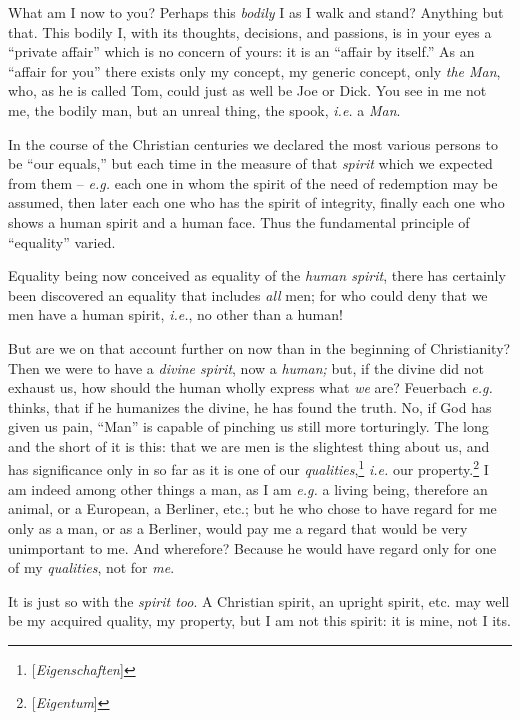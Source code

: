 \documentclass[12pt,a4paper]{book}
\begin{document}
What am I now to you? Perhaps this \textit{bodily} I as I walk and stand? 
Anything but that. This bodily I, with its thoughts, decisions, and passions, 
is in your eyes a ``private affair'' which is no concern of yours: it is an 
``affair by itself.'' As an ``affair for you'' there exists only my 
concept, my generic concept, only \textit{the Man}, who, as he is called Tom, 
could just as well be Joe or Dick. You see in me not me, the bodily man, but 
an unreal thing, the spook, \textit{i.e.} a \textit{Man}.

In the course of the Christian centuries we declared the most various persons 
to be ``our equals,'' but each time in the measure of that \textit{spirit} 
which we expected from them -- \textit{e.g.} each one in whom the spirit of 
the need of redemption may be assumed, then later each one who has the spirit 
of integrity, finally each one who shows a human spirit and a human face. Thus 
the fundamental principle of ``equality'' varied.

 Equality being now conceived as equality of the \textit{human spirit}, there 
has certainly been discovered an equality that includes \textit{all} men; for 
who could deny that we men have a human spirit, \textit{i.e.}, no other than 
a human!

But are we on that account further on now than in the beginning of 
Christianity? Then we were to have a \textit{divine spirit}, now a 
\textit{human;} but, if the divine did not exhaust us, how should the human 
wholly express what \textit{we} are? Feuerbach \textit{e.g.} thinks, that if 
he humanizes the divine, he has found the truth. No, if God has given us pain, 
``Man'' is capable of pinching us still more torturingly. The long and the 
short of it is this: that we are men is the slightest thing about us, and has 
significance only in so far as it is one of our 
\textit{qualities},\footnote{[\textit{Eigenschaften}]} \textit{i.e.} our 
property.\footnote{[\textit{Eigentum}]} I am indeed among other things a man, 
as I am \textit{e.g.} a living being, therefore an animal, or a European, a 
Berliner, etc.; but he who chose to have regard for me only as a man, or as a 
Berliner, would pay me a regard that would be very unimportant to me. And 
wherefore? Because he would have regard only for one of my \textit{qualities}, 
not for \textit{me}.

It is just so with the \textit{spirit too}. A Christian spirit, an upright 
spirit, etc. may well be my acquired quality, my property, but I am not this 
spirit: it is mine, not I its.
\end{document}
